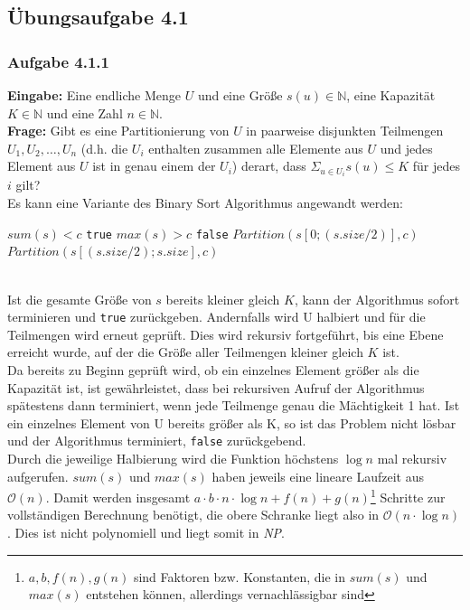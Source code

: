 \documentclass{article}
\begin{document}
\subsection{Übungsaufgabe 4.1}
\begin{flushright}
\begin{Large}
[~~~~\string| ~~3~]
\end{Large}
\end{flushright}
\subsubsection{Aufgabe 4.1.1}
\textbf{Eingabe:} Eine endliche Menge $U$ und eine Größe $s(u) \in \mathbb{N}$, eine Kapazität $K \in \mathbb{N}$ und eine Zahl $n \in \mathbb{N}$.\\
\textbf{Frage:} Gibt es eine Partitionierung von $U$ in paarweise disjunkten Teilmengen $U_1, U_2, \dots , U_n$ (d.h. die $U_i$ enthalten zusammen alle Elemente aus $U$ und jedes Element aus $U$ ist in genau einem der $U_i$) derart, dass $\Sigma_{u\in U_i}s(u) \leq K$ für jedes $i$ gilt?
\vspace{1cm}\-\\
Es kann eine Variante des Binary Sort Algorithmus angewandt werden:
	\begin{codebox}
        \li \If $sum(s) < c$
        \Indentmore
        	\li \Return \texttt{true}
        \li \ElseIf $max(s) > c$
       	\Indentmore
       		\li \Return \texttt{false}
        \li \Else
        	\li $Partition(s[0;(s.size/2)], c)$
   		   	\li $Partition(s[(s.size/2);s.size], c)$
	\end{codebox}
\-\\
Ist die gesamte Größe von $s$ bereits kleiner gleich $K$, kann der Algorithmus sofort terminieren und \texttt{true} zurückgeben.
Andernfalls wird U halbiert und für die Teilmengen wird erneut geprüft.
Dies wird rekursiv fortgeführt, bis eine Ebene erreicht wurde, auf der die Größe aller Teilmengen kleiner gleich $K$ ist.\\
Da bereits zu Beginn geprüft wird, ob ein einzelnes Element größer als die Kapazität ist, ist gewährleistet, dass bei rekursiven Aufruf der Algorithmus spätestens dann terminiert, wenn jede Teilmenge genau die Mächtigkeit 1 hat.
Ist ein einzelnes Element von U bereits größer als K, so ist das Problem nicht lösbar und der Algorithmus terminiert, \texttt{false} zurückgebend.\\
Durch die jeweilige Halbierung wird die Funktion höchstens $\operatorname{log} n$ mal rekursiv aufgerufen.
$sum(s)$ und $max(s)$ haben jeweils eine lineare Laufzeit aus $\mathcal{O}(n)$.
Damit werden insgesamt $a\cdot b\cdot n\cdot\operatorname{log}n + f(n) + g(n)$\footnote{$a, b, f(n), g(n)$ sind Faktoren bzw. Konstanten, die in $sum(s)$ und $max(s)$ entstehen können, allerdings vernachlässigbar sind} Schritte zur vollständigen Berechnung benötigt, die obere Schranke liegt also in $\mathcal{O}(n\cdot\operatorname{log}n)$.
Dies ist nicht polynomiell und liegt somit in \textit{NP}.
\end{document}
